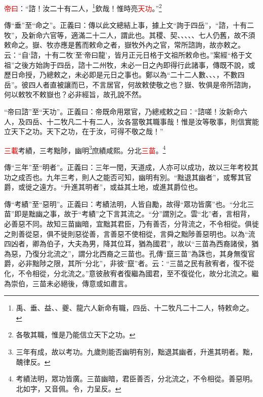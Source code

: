 \textcolor{red}{帝曰}：“諮！汝二十有二人，\footnote{禹、垂、益、、夔、龍六人新命有職，四岳、十二牧凡二十二人，特敕命之。}欽哉！惟時亮\textcolor{red}{天功}。”\footnote{各敬其職，惟是乃能信立天下之功。}

{\noindent\zhuan{}\fzbyks 傳“垂”至“命之”。正義曰：傳以此文總結上事，據上文“詢于四岳”，“諮，十有二牧”，及新命六官等，適滿二十二人，謂此也。其稷、契、、、、、七人仍舊，故不須敕命之。嶽、牧亦應是舊而敕命之者，嶽牧外內之官，常所諮詢，故亦敕之。云：“自‘諮，十有二牧’至‘帝曰龍’，皆月正元日格于文祖所敕命也。”案經“格于文祖”之後方始詢于四岳，諮十二州牧，未必一日之內即得行此諸事，傳既不說，或歷日命授，乃總敕之，未必即是元日之事也。鄭以為“二十二人數、、、，不數四岳”。彼四人者直被讓而已，不言居官，何故敕使敬之也？嶽、牧俱是帝所諮詢，何以敕牧不敕嶽也？必非經旨，故孔說不然。 \par}

{\noindent\shu{}\fzkt “帝曰諮”至“天功”。正義曰：帝既命用眾官，乃總戒敕之曰：“諮嗟！汝新命六人，及四岳、十二牧凡二十有二人，汝各當敬其職事哉！惟是汝等敬事，則信實能立天下之功。天下之功，在于汝，可得不敬之哉！” \par}

\textcolor{red}{三載}考績，三考黜陟，幽明\footnote{三年有成，故以考功。九歲則能否幽明有別，黜退其幽者，升進其明者。黜，醜律反。}庶績咸熙。分北\textcolor{red}{三苗}。\footnote{考績法明，眾功皆廣。三苗幽暗，君臣善否，分北流之，不令相從。善惡明。北如字，又音佩。令，力呈反。}

{\noindent\zhuan{}\fzbyks 傳“三年”至“明者”。正義曰：三年一閏，天道成，人亦可以成功，故以三年考校其功之成否也。九年三考，則人之能否可知，幽明有別。“黜退其幽者”，或奪其官爵，或徙之遠方。“升進其明者”，或益其土地，或進其爵位也。 \par}

{\noindent\zhuan{}\fzbyks 傳“考績”至“惡明”。正義曰：考績法明，人皆自勵，故得“眾功皆廣”也。“分北三苗”即是黜幽之事，故于“考績”之下言其流之。“分”謂別之。雲“北”者，言相背，必善惡不同。故知三苗幽暗，宜黜其君臣，乃有善否，分背流之，不令相從。俱徙之則善從惡，俱不徙則惡從善，言善惡不使相從，言舜之黜陟善惡明也。以為“流四凶者，卿為伯子，大夫為男，降其位耳，猶為國君”，故以“三苗為西裔諸侯，猶為惡，乃復分北流之”，謂分北西裔之三苗也。孔傳“竄三苗”為誅也，其身無復官爵，必非黜陟之限，其所“分北”，非彼“竄”者。云：“三苗之民有赦宥者，復不從化，不令相從，分北流之。”意彼赦宥者復繼為國君，至不復從化，故分北流之。繼為崇伯，三苗未必絕後，傳意或如肅言。 \par}

